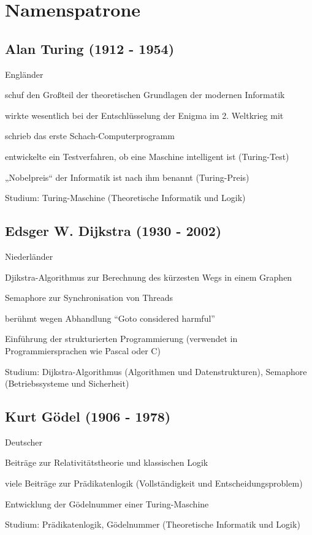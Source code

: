 \documentclass[a4paper,12pt]{scrreprt}
\begin{document}
\bigskip
\bigskip
\chapter{Namenspatrone}
\section*{Alan Turing (1912 - 1954)}
\begin{itemize*}
    \item Engländer
    \item schuf den Großteil der theoretischen Grundlagen der modernen Informatik
    \item wirkte wesentlich bei der Entschlüsselung der Enigma im 2. Weltkrieg mit
    \item schrieb das erste Schach-Computerprogramm
    \item entwickelte ein Testverfahren, ob eine Maschine intelligent ist (Turing-Test)
    \item „Nobelpreis“ der Informatik ist nach ihm benannt (Turing-Preis)
    \item Studium: Turing-Maschine (Theoretische Informatik und Logik)
\end{itemize*}

\section*{Edsger W. Dijkstra (1930 - 2002)}
\begin{itemize*}
    \item Niederländer
    \item Djikstra-Algorithmus zur Berechnung des kürzesten Wegs in einem Graphen
    \item Semaphore zur Synchronisation von Threads
    \item berühmt wegen Abhandlung ``Goto considered harmful''
    \item Einführung der strukturierten Programmierung (verwendet in Programmiersprachen wie
          Pascal oder C)
    \item Studium: Dijkstra-Algorithmus (Algorithmen und Datenstrukturen), Semaphore
          (Betriebssysteme und Sicherheit)
\end{itemize*}

\section*{Kurt Gödel (1906 - 1978)}
\begin{itemize*}
    \item Deutscher
    \item Beiträge zur Relativitätstheorie und klassischen Logik
    \item viele Beiträge zur Prädikatenlogik (Vollständigkeit und Entscheidungsproblem)
    \item Entwicklung der Gödelnummer einer Turing-Maschine
    \item Studium: Prädikatenlogik, Gödelnummer (Theoretische Informatik und Logik)
\end{itemize*}
\end{document}
